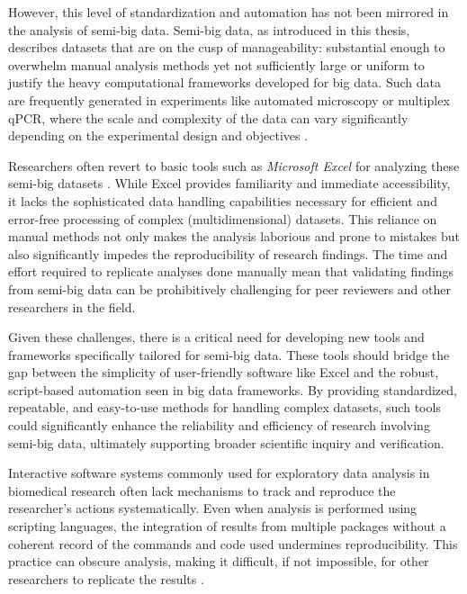 However, this level of standardization and automation has not been mirrored in
the analysis of semi-big data. Semi-big data, as introduced in this thesis,
describes datasets that are on the cusp of manageability: substantial enough to
overwhelm manual analysis methods yet not sufficiently large or uniform to
justify the heavy computational frameworks developed for big
data. Such data are frequently generated in experiments like automated
microscopy or multiplex qPCR, where the scale and complexity of the data can
vary significantly depending on the experimental design and objectives
\cite{krzywinskiMultidimensionalData2013}.

Researchers often revert to basic tools such as \textit{Microsoft Excel} for
analyzing these semi-big datasets \cite{incertiYouStillUsing2019a}. While Excel
provides familiarity and immediate accessibility, it lacks the sophisticated
data handling capabilities necessary for efficient and error-free processing of
complex (multidimensional) datasets. This reliance on manual methods not only
makes the analysis laborious and prone to mistakes but also significantly
impedes the reproducibility of research findings. The time and effort required
to replicate analyses done manually mean that validating findings from semi-big
data can be prohibitively challenging for peer reviewers and other researchers
in the field.

Given these challenges, there is a critical need for developing new tools and
frameworks specifically tailored for semi-big data. These tools should bridge
the gap between the simplicity of user-friendly software like Excel and the
robust, script-based automation seen in big data frameworks. By providing
standardized, repeatable, and easy-to-use methods for handling complex datasets,
such tools could significantly enhance the reliability and efficiency of
research involving semi-big data, ultimately supporting broader scientific
inquiry and verification.





%
\label{sec:nontransparent_tools}%
Interactive software systems commonly used for exploratory data analysis in
biomedical research often lack mechanisms to track and reproduce the
researcher's actions systematically. Even when analysis is performed
using scripting languages, the integration of results from multiple packages
without a coherent record of the commands and code used undermines
reproducibility. This practice can obscure analysis, making it
difficult, if not impossible, for other researchers to replicate the results
\cite{pengReproducibleResearchComputational2011,
mesirovAccessibleReproducibleResearch2010, localioStatisticalCodeSupport2018}.

